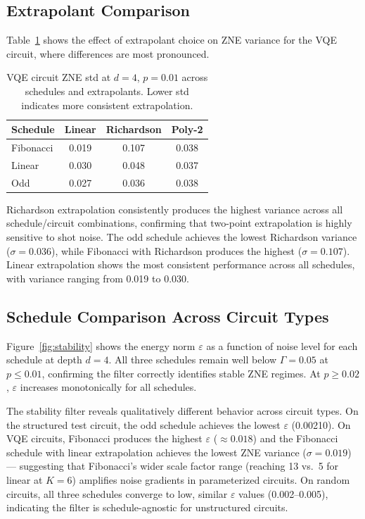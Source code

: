\documentclass[twocolumn,showpacs,preprintnumbers,amsmath,amssymb,prl]{revtex4-2}
\begin{document}
\subsection{Extrapolant Comparison}

Table~\ref{tab:extrapolants} shows the effect of extrapolant choice
on ZNE variance for the VQE circuit, where differences are most pronounced.

\begin{table}[!ht]
\centering
\caption{VQE circuit ZNE std at $d=4$, $p=0.01$ across schedules
and extrapolants. Lower std indicates more consistent extrapolation.}
\label{tab:extrapolants}
\begin{tabular}{lccc}
\toprule
Schedule & Linear & Richardson & Poly-2 \\
\midrule
Fibonacci & 0.019 & 0.107 & 0.038 \\
Linear    & 0.030 & 0.048 & 0.037 \\
Odd       & 0.027 & 0.036 & 0.038 \\
\bottomrule
\end{tabular}
\end{table}

Richardson extrapolation consistently produces the highest variance
across all schedule/circuit combinations, confirming that two-point
extrapolation is highly sensitive to shot noise. The odd schedule
achieves the lowest Richardson variance ($\sigma = 0.036$), while
Fibonacci with Richardson produces the highest ($\sigma = 0.107$).
Linear extrapolation shows the most consistent performance across
all schedules, with variance ranging from 0.019 to 0.030.

\subsection{Schedule Comparison Across Circuit Types}

Figure~\ref{fig:stability} shows the energy norm $\varepsilon$ as a
function of noise level for each schedule at depth $d=4$.
All three schedules remain well below $\Gamma = 0.05$ at
$p \leq 0.01$, confirming the filter correctly identifies stable
ZNE regimes. At $p \geq 0.02$, $\varepsilon$ increases monotonically
for all schedules.

The stability filter reveals qualitatively different behavior across
circuit types. On the structured test circuit, the odd schedule
achieves the lowest $\varepsilon$ (0.00210). On VQE circuits,
Fibonacci produces the highest $\varepsilon$ ($\approx 0.018$) and
the Fibonacci schedule with linear extrapolation achieves the lowest
ZNE variance ($\sigma = 0.019$) — suggesting that Fibonacci's
wider scale factor range (reaching 13 vs.\ 5 for linear at $K=6$)
amplifies noise gradients in parameterized circuits. On random
circuits, all three schedules converge to low, similar
$\varepsilon$ values (0.002--0.005), indicating the filter is
schedule-agnostic for unstructured circuits.
\end{document}
